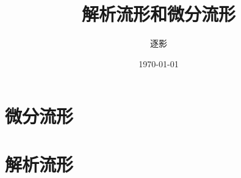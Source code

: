 \documentclass[UTF8,10pt, a4paper, oneside,scheme=plain]{ctexbook}
\author{逐影}
\title{\Huge\textbf{解析流形和微分流形}}
\date{\today}
\begin{document}
\frontmatter
\maketitle
\tableofcontents
\mainmatter

\part{微分流形}


\part{解析流形}


\backmatter
\end{document}
